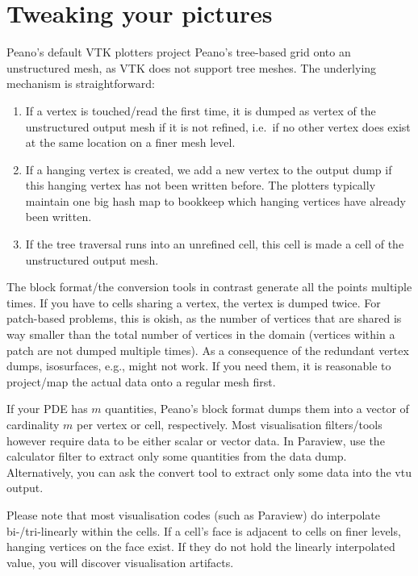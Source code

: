     
\section{Tweaking your pictures}

Peano's default VTK plotters project Peano's tree-based grid onto an
unstructured mesh, as VTK does not support tree meshes.
The underlying mechanism is straightforward:

\begin{enumerate}
  \item If a vertex is touched/read the first time, it is dumped as vertex of
  the unstructured output mesh if it is not refined, i.e.~if no other vertex
  does exist at the same location on a finer mesh level.
  \item If a hanging vertex is created, we add a new vertex to the output dump
  if this hanging vertex has not been written before. The plotters typically
  maintain one big hash map to bookkeep which hanging vertices have already been
  written.
  \item If the tree traversal runs into an unrefined cell, this cell is made a
  cell of the unstructured output mesh.
\end{enumerate}


The block format/the conversion tools in contrast generate all the points
multiple times.
If you have to cells sharing a vertex, the vertex is dumped twice.
For patch-based problems, this is okish, as the number of vertices that are
shared is way smaller than the total number of vertices in the domain (vertices
within a patch are not dumped multiple times).
As a consequence of the redundant vertex dumps, isosurfaces, e.g., might not
work.
If you need them, it is reasonable to project/map the actual data onto a regular
mesh first.


If your PDE has $m$ quantities, Peano's block format dumps them into a vector of
cardinality $m$ per vertex or cell, respectively. 
Most visualisation filters/tools however require data to be either scalar or 
vector data. 
In Paraview, use the calculator filter to extract only some quantities from the 
data dump.
Alternatively, you can ask the convert tool to extract only some data into the
vtu output.

\noindent
Please note that most visualisation codes (such as Paraview) do interpolate
bi-/tri-linearly within the cells. 
If a cell's face is adjacent to cells on finer levels, hanging vertices on the
face exist.
If they do not hold the linearly interpolated value, you will discover
visualisation artifacts.


